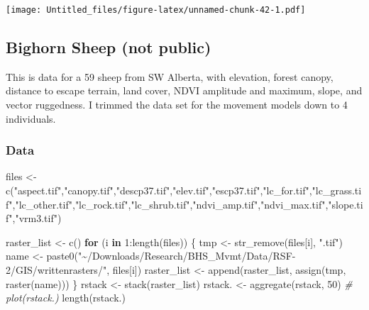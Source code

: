 \documentclass[
]{article}
\newenvironment{Shaded}{\begin{snugshade}}{\end{snugshade}}
\newcommand{\CommentTok}[1]{\textcolor[rgb]{0.56,0.35,0.01}{\textit{#1}}}
\newcommand{\ControlFlowTok}[1]{\textcolor[rgb]{0.13,0.29,0.53}{\textbf{#1}}}
\newcommand{\DecValTok}[1]{\textcolor[rgb]{0.00,0.00,0.81}{#1}}
\newcommand{\FunctionTok}[1]{\textcolor[rgb]{0.00,0.00,0.00}{#1}}
\newcommand{\NormalTok}[1]{#1}
\newcommand{\OtherTok}[1]{\textcolor[rgb]{0.56,0.35,0.01}{#1}}
\newcommand{\SpecialCharTok}[1]{\textcolor[rgb]{0.00,0.00,0.00}{#1}}
\newcommand{\StringTok}[1]{\textcolor[rgb]{0.31,0.60,0.02}{#1}}
\begin{document}
\texttt{[image: Untitled\_files/figure-latex/unnamed-chunk-42-1.pdf]}

\hypertarget{bighorn-sheep-not-public}{%
\subsection{Bighorn Sheep (not public)}\label{bighorn-sheep-not-public}}

This is data for a 59 sheep from SW Alberta, with elevation, forest
canopy, distance to escape terrain, land cover, NDVI amplitude and
maximum, slope, and vector ruggedness. I trimmed the data set for the
movement models down to 4 individuals.

\hypertarget{data-2}{%
\subsubsection{Data}\label{data-2}}

\begin{Shaded}
\begin{Highlighting}[]
\NormalTok{files }\OtherTok{\textless{}{-}} \FunctionTok{c}\NormalTok{(}\StringTok{"aspect.tif"}\NormalTok{,}\StringTok{"canopy.tif"}\NormalTok{,}\StringTok{"descp37.tif"}\NormalTok{,}\StringTok{"elev.tif"}\NormalTok{,}\StringTok{"escp37.tif"}\NormalTok{,}\StringTok{"lc\_for.tif"}\NormalTok{,}\StringTok{"lc\_grass.tif"}\NormalTok{,}\StringTok{"lc\_other.tif"}\NormalTok{,}\StringTok{"lc\_rock.tif"}\NormalTok{,}\StringTok{"lc\_shrub.tif"}\NormalTok{,}\StringTok{"ndvi\_amp.tif"}\NormalTok{,}\StringTok{"ndvi\_max.tif"}\NormalTok{,}\StringTok{"slope.tif"}\NormalTok{,}\StringTok{"vrm3.tif"}\NormalTok{)}

\NormalTok{raster\_list }\OtherTok{\textless{}{-}} \FunctionTok{c}\NormalTok{()}
\ControlFlowTok{for}\NormalTok{ (i }\ControlFlowTok{in} \DecValTok{1}\SpecialCharTok{:}\FunctionTok{length}\NormalTok{(files)) \{}
\NormalTok{  tmp }\OtherTok{\textless{}{-}} \FunctionTok{str\_remove}\NormalTok{(files[i], }\StringTok{".tif"}\NormalTok{)}
\NormalTok{  name }\OtherTok{\textless{}{-}} \FunctionTok{paste0}\NormalTok{(}\StringTok{"\textasciitilde{}/Downloads/Research/BHS\_Mvmt/Data/RSF{-}2/GIS/writtenrasters/"}\NormalTok{,}
\NormalTok{                 files[i])}
\NormalTok{  raster\_list }\OtherTok{\textless{}{-}} \FunctionTok{append}\NormalTok{(raster\_list,  }\FunctionTok{assign}\NormalTok{(tmp, }\FunctionTok{raster}\NormalTok{(name)))}
\NormalTok{\}}
\NormalTok{rstack }\OtherTok{\textless{}{-}} \FunctionTok{stack}\NormalTok{(raster\_list)}
\NormalTok{rstack. }\OtherTok{\textless{}{-}} \FunctionTok{aggregate}\NormalTok{(rstack, }\DecValTok{50}\NormalTok{)}
\CommentTok{\# plot(rstack.)}
\FunctionTok{length}\NormalTok{(rstack.)}
\end{Highlighting}
\end{Shaded}
\end{document}
